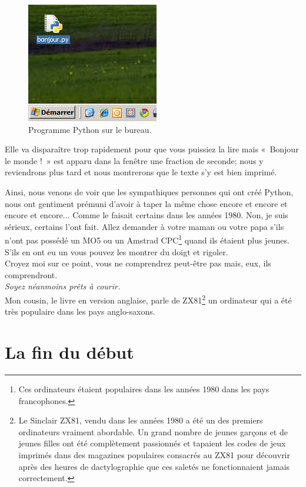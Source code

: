 \begin{figure}[!ht]
\centering
\includegraphics[scale=0.6]{images/bureau}
\caption{Programme Python sur le bureau.}\label{fig:bureau}
\end{figure}

Elle va disparaître trop rapidement pour que vous puissiez la lire mais «~Bonjour le monde !~» est apparu dans la fenêtre une fraction de seconde; nous y reviendrons plus tard et nous montrerons que le texte s'y est bien imprimé.

Ainsi, nous venons de voir que les sympathiques personnes qui ont créé Python, nous ont gentiment prémuni d'avoir à taper la même chose encore et encore et encore et encore... Comme le faisait certains dans les années 1980. Non, je suis sérieux, certains l'ont fait. Allez demander à votre maman ou votre papa s'ils n'ont pas possédé un MO5 ou un Amstrad CPC\footnote{Ces ordinateurs étaient populaires dans les années 1980 dans les pays francophones.} quand ils étaient plus jeunes. S'ils en ont eu un vous pouvez les montrer du doigt et rigoler.\\


Croyez moi sur ce point, vous ne comprendrez peut-être pas mais, eux, ils comprendront.\\

\emph{Soyez néanmoins prêts à courir.}\\


Mon cousin, le livre en version anglaise, parle de ZX81\footnote{Le Sinclair ZX81, vendu dans les années 1980 a été un des premiers ordinateurs vraiment abordable. Un grand nombre de jeunes garçons et de jeunes filles ont été complètement passionnés et tapaient les codes de jeux imprimés dans des magazines populaires consacrés au ZX81 pour découvrir après des heures de dactylographie que ces saletés ne fonctionnaient jamais correctement.} un ordinateur qui a été très populaire dans les pays anglo-saxons.


\section*{La fin du début}


